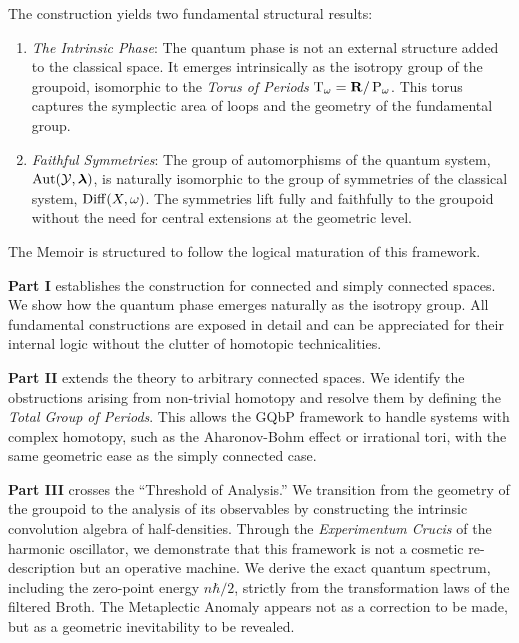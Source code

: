 \documentclass[10pt,reqno,letterpaper,twoside]{amsbook}
\begin{document}
  The construction yields two fundamental structural results:
  \begin{enumerate}
    \item \emph{The Intrinsic Phase}:
    The quantum phase is not an external structure added to the classical space.
    It emerges intrinsically as the isotropy group of the groupoid,
    isomorphic to the \emph{Torus of Periods} $\mathrm{T}_\omega = {\mathbf{R}}/\operatorname{P}_\omega$.
    This torus captures the symplectic area of loops and the geometry of the fundamental group.
    \item \emph{Faithful Symmetries}:
    The group of automorphisms of the quantum system,
    $\operatorname{Aut}(\mathcal{Y},\boldsymbol \lambda)$,
    is naturally isomorphic to the group of symmetries of the classical system,
    $\operatorname{Diff}(X, \omega)$.
    The symmetries lift fully and faithfully to the groupoid without the need for central extensions at the geometric level.
  \end{enumerate}
  
  The Memoir is structured to follow the logical maturation of this framework.
  
  \textbf{Part I} establishes the construction for connected and simply connected spaces.
  We show how the quantum phase emerges naturally as the isotropy group.
  All fundamental constructions are exposed in detail and can be appreciated for their internal logic without the clutter of homotopic technicalities.
  
  \textbf{Part II} extends the theory to arbitrary connected spaces.
  We identify the obstructions arising from non-trivial homotopy and resolve them by defining the \emph{Total Group of Periods}.
  This allows the GQbP framework to handle systems with complex homotopy,
  such as the Aharonov-Bohm effect or irrational tori,
  with the same geometric ease as the simply connected case.
  
  \textbf{Part III} crosses the ``Threshold of Analysis.''
  We transition from the geometry of the groupoid to the analysis of its observables by constructing the intrinsic convolution algebra of half-densities.
  Through the \emph{Experimentum Crucis} of the harmonic oscillator,
  we demonstrate that this framework is not a cosmetic re-description but an operative machine.
  We derive the exact quantum spectrum,
  including the zero-point energy $n\hbar/2$,
  strictly from the transformation laws of the filtered Broth.
  The Metaplectic Anomaly appears not as a correction to be made,
  but as a geometric inevitability to be revealed.
  
\end{document}
